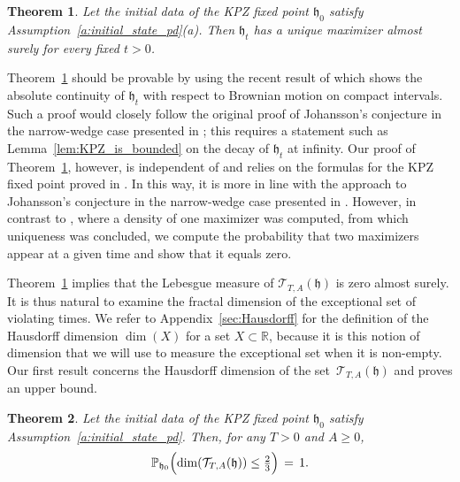 \documentclass[oneside,final,11pt]{amsart}
\newtheorem{thm}{Theorem}[section]
\theoremstyle{definition}
\newcommand{\fh}{\mathfrak{h}}
\newcommand{\R}{\mathbb{R}}
\newcommand{\CT}{\mathcal{T}}
\newcommand{\1}[1]{\mathbf{1}_{#1}}
\newcommand{\blue}[1]{{\color{blue}#1}}
\newcommand{\km}[1]{\marginnote{\tiny{\color{red}[KM: #1]}}}
\newcommand{\kmtext}[1]{{\color{red}[KM:#1]}}
\newcommand{\Argmax}{\mathrm{Arg max}}
\renewcommand{\P}{\mathbb P}
\let\emptyset\varnothing
\numberwithin{equation}{section}
\begin{document}
\begin{thm}\label{thm:johansson}
Let the initial data of the KPZ fixed point $\fh_0$ satisfy Assumption~\ref{a:initial_state_pd}(a). Then $\fh_t$ has a unique maximizer almost surely for every fixed $t>0$.
\end{thm}

Theorem~\ref{thm:johansson} should be provable by using the recent result of \cite{sarkar2020brownian} which shows the absolute continuity of $\fh_t$ with respect to Brownian motion on compact intervals. Such a proof would closely follow the original proof of Johansson's conjecture in the narrow-wedge case presented in \cite{BrownianGibbs}; this requires a statement such as Lemma~\ref{lem:KPZ_is_bounded} on the decay of $\fh_t$ at infinity. Our proof of Theorem~\ref{thm:johansson}, however, is independent of \cite{sarkar2020brownian} and relies on the formulas for the KPZ fixed point proved in \cite{fixedpt}. In this way, it is more in line with the approach to Johansson's conjecture in the narrow-wedge case presented in \cite{MaxOfAiry2}. However, in contrast to \cite{MaxOfAiry2}, where a density of one maximizer was computed, from which uniqueness was concluded, we compute the probability that two maximizers appear at a given time and show that it equals zero.

Theorem~\ref{thm:johansson} implies that the Lebesgue measure of $\CT_{T,A}(\fh)$
is zero almost surely. It is thus natural to examine the fractal dimension of the exceptional set of violating times.  We refer to Appendix~\ref{sec:Hausdorff} for the definition of
the Hausdorff dimension $\dim(X)$ for a set $X \subset \R$, because it is this notion of dimension that we will use to measure the exceptional set when it is non-empty. Our first result concerns the Hausdorff dimension of the set~$\CT_{T,A}(\fh)$ and proves an upper bound.%


\begin{thm}\label{thm:main}
Let the initial data of the KPZ fixed point $\fh_0$ satisfy Assumption~\ref{a:initial_state_pd}.
Then, for any $T > 0$ and $A\geq 0$,%
\begin{equation}\label{eq:dimTP}
\P_{\fh_0}\Bigl(\dim(\CT_{T,A}(\fh)) \leq \tfrac{2}{3}\Bigr) \, = \, 1.
\end{equation}
\end{thm}
\end{document}
